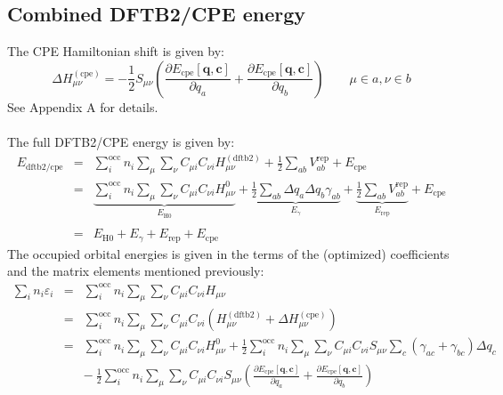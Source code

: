 \documentclass{article}
\numberwithin{equation}{section}
\begin{document}
\subsection{Combined DFTB2/CPE energy}
The CPE Hamiltonian shift is given by:\cite{gieseyork2012}
\begin{equation}
    \Delta H_{\mu\nu}^{\mathrm{(cpe)}} =  - \frac{1}{2} S_{\mu\nu} \left(
    \frac{\partial E_{\mathrm{cpe}}\left[\mathbf{q}, \mathbf{c}\right]}{\partial q_a} +
    \frac{\partial E_{\mathrm{cpe}}\left[\mathbf{q}, \mathbf{c}\right]}{\partial q_b}
\right) \qquad \mu \in a, \nu \in b
\end{equation}
See Appendix A for details.
\\\\The full DFTB2/CPE energy is given by:
\begin{eqnarray}
    E_\mathrm{{dftb2/cpe}} &=& \sum_i^\mathrm{occ} n_i \sum_{\mu} \sum_{\nu}  C_{\mu i} C_{\nu i} H_{\mu\nu}^{\mathrm{(dftb2)}}  
    + \frac{1}{2} \sum_{ab} V^\mathrm{rep}_{ab}
    + E_{\mathrm{cpe}} \nonumber\\
    &=& \underbrace{\sum_i^\mathrm{occ} n_i  \sum_\mu \sum_\nu C_{\mu i}  C_{\nu i} H^0_{\mu\nu}}_{E_\mathrm{H0}}
        + \underbrace{\frac{1}{2} \sum_{ab} \Delta q_a \Delta q_b \gamma_{ab}}_{E_\gamma}
    + \underbrace{\frac{1}{2} \sum_{ab} V^\mathrm{rep}_{ab}}_{E_\mathrm{rep}}
 + E_{\mathrm{cpe}}\\\nonumber\\
&=&  E_\mathrm{H0} + E_\gamma + E_\mathrm{rep} + E_\mathrm{cpe}\label{eq:shorthand}
\end{eqnarray}
The occupied orbital energies is given in the terms of the (optimized) coefficients and the matrix elements mentioned previously:
\begin{eqnarray}
    \sum_i n_i \varepsilon_i 
    &=& \sum_i^\mathrm{occ} n_i \sum_{\mu} \sum_{\nu}  C_{\mu i} C_{\nu i} H_{\mu\nu}\nonumber\\
    &=& \sum_i^\mathrm{occ} n_i \sum_{\mu} \sum_{\nu}  C_{\mu i} C_{\nu i} \left(H_{\mu\nu}^{\mathrm{(dftb2)}} + \Delta H_{\mu\nu}^{\mathrm{(cpe)}} \right)\nonumber\\
    &=& \sum_i^\mathrm{occ} n_i \sum_{\mu} \sum_{\nu}  C_{\mu i} C_{\nu i} H_{\mu\nu}^0
    + \frac{1}{2} \sum_i^\mathrm{occ} n_i \sum_{\mu} \sum_{\nu}  C_{\mu i} C_{\nu i} S_{\mu\nu} \sum_c \left( \gamma_{ac} + \gamma_{bc} \right)\Delta q_c \nonumber\\
    && -\ \frac{1}{2} \sum_i^\mathrm{occ} n_i \sum_{\mu} \sum_{\nu}  C_{\mu i} C_{\nu i} S_{\mu\nu} \left(
    \frac{\partial E_{\mathrm{cpe}}\left[\mathbf{q}, \mathbf{c}\right]}{\partial q_a} +
    \frac{\partial E_{\mathrm{cpe}}\left[\mathbf{q}, \mathbf{c}\right]}{\partial q_b} \right)\label{eq:orbital_energies}
\end{eqnarray}
\end{document}
